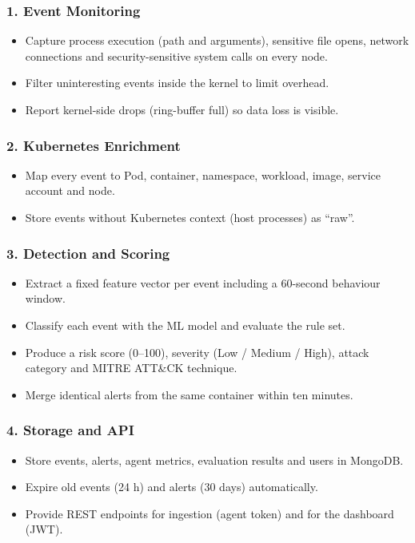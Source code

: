 \subsubsection*{1. Event Monitoring}
\begin{itemize}
    \item Capture process execution (path and arguments), sensitive file opens, network
          connections and security-sensitive system calls on every node.
    \item Filter uninteresting events inside the kernel to limit overhead.
    \item Report kernel-side drops (ring-buffer full) so data loss is visible.
\end{itemize}

\subsubsection*{2. Kubernetes Enrichment}
\begin{itemize}
    \item Map every event to Pod, container, namespace, workload, image, service account
          and node.
    \item Store events without Kubernetes context (host processes) as ``raw''.
\end{itemize}

\subsubsection*{3. Detection and Scoring}
\begin{itemize}
    \item Extract a fixed feature vector per event including a 60-second behaviour window.
    \item Classify each event with the ML model and evaluate the rule set.
    \item Produce a risk score (0--100), severity (Low / Medium / High), attack category
          and MITRE ATT\&CK technique.
    \item Merge identical alerts from the same container within ten minutes.
\end{itemize}

\subsubsection*{4. Storage and API}
\begin{itemize}
    \item Store events, alerts, agent metrics, evaluation results and users in MongoDB.
    \item Expire old events (24 h) and alerts (30 days) automatically.
    \item Provide REST endpoints for ingestion (agent token) and for the dashboard (JWT).
\end{itemize}


